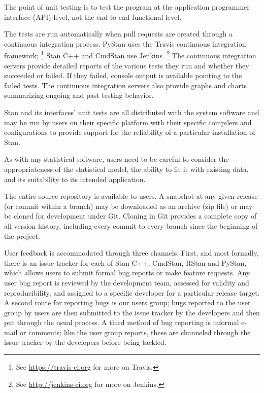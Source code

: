 The point of unit testing is to test the program at the application
programmer interface (API) level, not the end-to-end functional level.

The tests are run automatically when pull requests are created through
a continuous integration process. PyStan uses the Travis continuous
integration framework;%
%
\footnote{See \url{https://travis-ci.org} for more on Travis.}
%
Stan C++ and CmdStan use Jenkins.%
%
\footnote{See \url{http://jenkins-ci.org} for more on Jenkins.}
%
The continuous integration servers provide detailed reports of the
various tests they run and whether they succeeded or failed.  If they
failed, console output is available pointing to the failed tests.  The
continuous integration servers also provide graphs and charts
summarizing ongoing and past testing behavior.

Stan and its interfaces' unit tests are all distributed with the
system software and may be run by users on their specific platform
with their specific compilers and configurations to provide support
for the reliability of a particular installation of Stan.

As with any statistical software, users need to be careful to consider
the appropriateness of the statistical model, the ability to fit it
with existing data, and its suitability to its intended application.

The entire source repository is available to users.  A snapshot at any
given release (or commit within a branch) may be downloaded as an
archive (zip file) or may be cloned for development under Git.
Cloning in Git provides a complete copy of all version history,
including every commit to every branch since the beginning of the
project.

User feedback is accommodated through three channels. First, and most
formally, there is an issue tracker for each of Stan C++, CmdStan,
RStan and PyStan, which allows users to submit formal bug reports or
make feature requests.  Any user bug report is reviewed by the
development team, assessed for validity and reproducibility, and
assigned to a specific developer for a particular release target.
A second route for reporting bugs is our users group;  bugs reported
to the user group by users are then submitted to the issue tracker by
the developers and then put through the usual process.  A third method
of bug reporting is informal e-mail or comments; like the user group
reports, these are channeled through the issue tracker by the
developers before being tackled.

